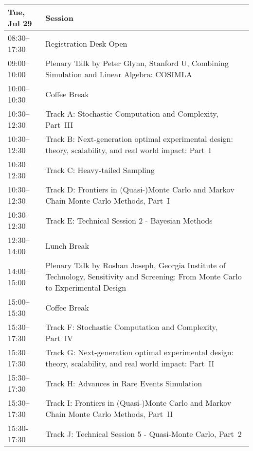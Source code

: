 \begin{table}
{\footnotesize
\begin{tabularx}{\textwidth}{>{\hsize=0.32\hsize}X|>{\hsize=1.7\hsize}X}
\hline
\textbf{Tue, Jul 29} & \textbf{Session} \\
\hline
\cellcolor{\EmptyColor}08:30–17:30 & \cellcolor{\EmptyColor}Registration Desk Open \\
\cellcolor{\PlenaryColor}09:00–10:00 & \cellcolor{\PlenaryColor}Plenary Talk by Peter Glynn, Stanford U, Combining Simulation and Linear Algebra: COSIMLA \\
\cellcolor{\EmptyColor}10:00–10:30 & \cellcolor{\EmptyColor}Coffee Break \\
\cellcolor{\SessionTitleColor}10:30–12:30 & \cellcolor{\SessionTitleColor}Track A: Stochastic Computation and Complexity, Part~III \\
\cellcolor{\SessionTitleColor}10:30–12:30 & \cellcolor{\SessionTitleColor}Track B: Next-generation optimal experimental design: theory, scalability, and real world impact: Part~I \\
\cellcolor{\SessionTitleColor}10:30–12:30 & \cellcolor{\SessionTitleColor}Track C: Heavy-tailed Sampling \\
\cellcolor{\SessionTitleColor}10:30–12:30 & \cellcolor{\SessionTitleColor}Track D: Frontiers in (Quasi-)Monte Carlo and Markov Chain Monte Carlo Methods, Part~I \\
\cellcolor{\SessionLightColor}10:30-12:30 & \cellcolor{\SessionLightColor}Track E: Technical Session 2 - Bayesian Methods \\
\cellcolor{\EmptyColor}12:30–14:00 & \cellcolor{\EmptyColor}Lunch Break \\
\cellcolor{\PlenaryColor}14:00–15:00 & \cellcolor{\PlenaryColor}Plenary Talk by Roshan Joseph, Georgia Institute of Technology, Sensitivity and Screening: From Monte Carlo to Experimental Design \\
\cellcolor{\EmptyColor}15:00–15:30 & \cellcolor{\EmptyColor}Coffee Break \\
\cellcolor{\SessionTitleColor}15:30–17:30 & \cellcolor{\SessionTitleColor}Track F: Stochastic Computation and Complexity, Part~IV \\
\cellcolor{\SessionTitleColor}15:30–17:30 & \cellcolor{\SessionTitleColor}Track G: Next-generation optimal experimental design: theory, scalability, and real world impact: Part~II \\
\cellcolor{\SessionTitleColor}15:30–17:30 & \cellcolor{\SessionTitleColor}Track H: Advances in Rare Events Simulation \\
\cellcolor{\SessionTitleColor}15:30–17:30 & \cellcolor{\SessionTitleColor}Track I: Frontiers in (Quasi-)Monte Carlo and Markov Chain Monte Carlo Methods, Part~II \\
\cellcolor{\SessionLightColor}15:30-17:30 & \cellcolor{\SessionLightColor}Track J: Technical Session 5 - Quasi-Monte Carlo, Part~2 \\
\hline
\end{tabularx}
}
\end{table}

